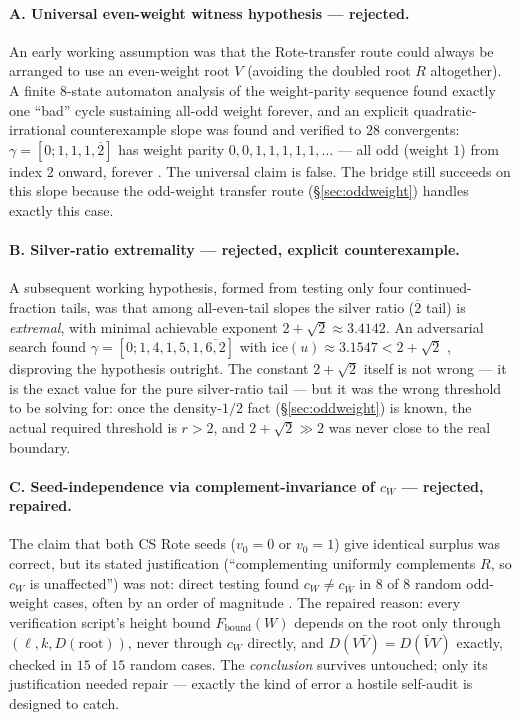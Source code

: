 \documentclass[11pt]{article}
\begin{document}
\paragraph{A. Universal even-weight witness hypothesis --- rejected.} An early working assumption was that the Rote-transfer route could always be arranged to use an even-weight root $V$ (avoiding the doubled root $R$ altogether). A finite $8$-state automaton analysis of the weight-parity sequence found exactly one ``bad'' cycle sustaining all-odd weight forever, and an explicit quadratic-irrational counterexample slope was found and verified to $28$ convergents: $\gamma=[0;1,1,1,\overline{2}]$ has weight parity $0,0,1,1,1,1,1,\ldots$ --- all odd (weight $1$) from index $2$ onward, forever \cite{Phase3Automaton}. The universal claim is false. The bridge still succeeds on this slope because the odd-weight transfer route (\S\ref{sec:oddweight}) handles exactly this case.

\paragraph{B. Silver-ratio extremality --- rejected, explicit counterexample.} A subsequent working hypothesis, formed from testing only four continued-fraction tails, was that among all-even-tail slopes the silver ratio ($\overline{2}$ tail) is \emph{extremal}, with minimal achievable exponent $2+\sqrt2\approx3.4142$. An adversarial search found $\gamma=[0;1,4,1,5,1,\overline{6,2}]$ with $\text{ice}(u)\approx3.1547 < 2+\sqrt2$ \cite{Phase4Silver}, disproving the hypothesis outright. The constant $2+\sqrt2$ itself is not wrong --- it is the exact value for the pure silver-ratio tail \cite{Phase4SilverAudit} --- but it was the wrong threshold to be solving for: once the density-$1/2$ fact (\S\ref{sec:oddweight}) is known, the actual required threshold is $r>2$, and $2+\sqrt2\gg2$ was never close to the real boundary.

\paragraph{C. Seed-independence via complement-invariance of $c_W$ --- rejected, repaired.} The claim that both CS Rote seeds ($v_0=0$ or $v_0=1$) give identical surplus was correct, but its stated justification (``complementing uniformly complements $R$, so $c_W$ is unaffected'') was not: direct testing found $c_W\ne c_{\bar W}$ in $8$ of $8$ random odd-weight cases, often by an order of magnitude \cite{Phase5Hostile}. The repaired reason: every verification script's height bound $F_{\text{bound}}(W)$ depends on the root only through $(\ell,k,D(\text{root}))$, never through $c_W$ directly, and $D(V\bar V)=D(\bar V V)$ exactly, checked in $15$ of $15$ random cases. The \emph{conclusion} survives untouched; only its justification needed repair --- exactly the kind of error a hostile self-audit is designed to catch.
\end{document}
